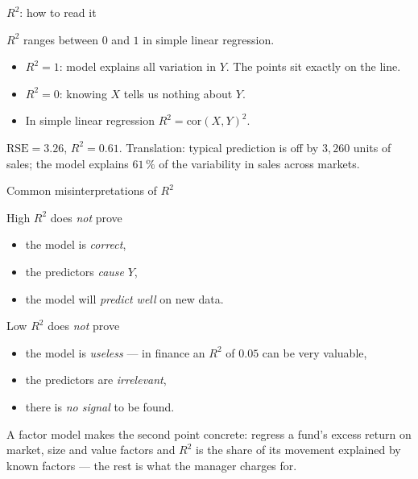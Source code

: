\documentclass[aspectratio=169,11pt]{beamer}
\begin{document}
\begin{frame}{$R^2$: how to read it}
  \begin{readme}
    $R^2$ ranges between $0$ and $1$ in simple linear regression.
    \begin{itemize}
      \item $R^2 = 1$: model explains all variation in $Y$. The points
            sit exactly on the line.
      \item $R^2 = 0$: knowing $X$ tells us nothing about $Y$.
      \item In simple linear regression $R^2 = \mathrm{cor}(X, Y)^2$.
    \end{itemize}
  \end{readme}
  \begin{numexample}
    $\mathrm{RSE} = 3.26$, $R^2 = 0.61$. Translation: typical
    prediction is off by $3{,}260$ units of sales; the model explains
    $61\,\%$ of the variability in sales across markets.
  \end{numexample}
\end{frame}

\begin{frame}{Common misinterpretations of $R^2$}\label{frm:r2mis}
  \begin{alertblock}{High $R^2$ does \emph{not} prove}
    \begin{itemize}
      \item the model is \emph{correct},
      \item the predictors \emph{cause} $Y$,
      \item the model will \emph{predict well} on new data.
    \end{itemize}
  \end{alertblock}
  \begin{alertblock}{Low $R^2$ does \emph{not} prove}
    \begin{itemize}
      \item the model is \emph{useless} --- in finance an $R^2$ of $0.05$
            can be very valuable,
      \item the predictors are \emph{irrelevant},
      \item there is \emph{no signal} to be found.
    \end{itemize}
  \end{alertblock}
  A factor model makes the second point concrete: regress a fund's excess return
  on market, size and value factors and $R^2$ is the share of its movement
  explained by known factors --- the rest is what the manager charges for.
\end{frame}
\end{document}
